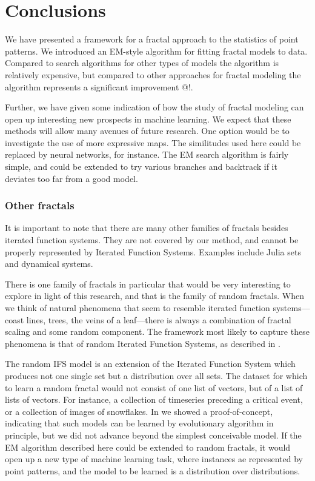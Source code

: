 \documentclass[10pt,a4paper,oneside]{article}
\theoremstyle{definition}
\begin{document}
\section*{Conclusions}

We have presented a framework for a fractal approach to the statistics of point patterns. We introduced an EM-style algorithm for fitting fractal models to data. Compared to search algorithms for other types of models the algorithm is relatively expensive, but compared to other approaches for fractal modeling the algorithm represents a significant improvement @!. 

Further, we have given some indication of how the study of fractal modeling can open up interesting new prospects in machine learning. We expect that these methods will allow many avenues of future research. One option would be to investigate the use of more expressive maps. The similitudes used here could be replaced by neural networks, for instance. The EM search algorithm is fairly simple, and could be extended to try various branches and backtrack if it deviates too far from a good model.

\subsubsection*{Other fractals}

It is important to note that there are many other families of fractals besides iterated function systems. They are not covered by our method, and cannot be properly represented by Iterated Function Systems. Examples include Julia sets and dynamical systems.

There is one family of fractals in particular that would be very interesting to explore in light of this research, and that is the family of random fractals. When we think of natural phenomena that seem to resemble iterated function systems---coast lines, trees, the veins of a leaf---there is always a combination of fractal scaling and some random component. The framework most likely to capture these phenomena is that of random Iterated Function Systems, as described in \cite{hutchinson2000deterministic}.

The random IFS model is an extension of the Iterated Function System which produces not one single set but a distribution over all sets. The dataset for which to learn a random fractal would not consist of one list of vectors, but of a list of lists of vectors. For instance, a collection of timeseries preceding a critical event, or a collection of images of snowflakes. In \cite{bloem2010fractal} we showed a proof-of-concept, indicating that such models can be learned by evolutionary algorithm in principle, but we did not advance beyond the simplest conceivable model. If the EM algorithm described here could be extended to random fractals, it would open up a new type of machine learning task, where instances ae represented by point patterns, and the model to be learned is a distribution over distributions.  



\end{document}
